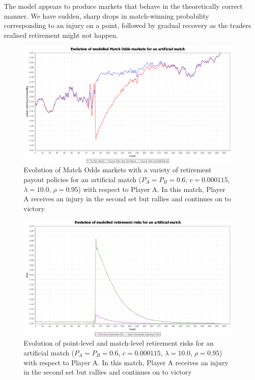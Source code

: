 \documentclass[letterpaper,12pt]{article}
\begin{document}
The model appears to produce markets that behave in the theoretically correct manner.  We have sudden, sharp drops in match-winning probability corresponding to an injury on a point, followed by gradual recovery as the traders realised retirement might not happen.

\begin{figure}[h!]
\centering \includegraphics[width=12.5cm]{matches/artificialwin}
\caption{Evolution of Match Odds markets with a variety of retirement payout policies for an artificial match ($P_A = P_B = 0.6$, $c = 0.000115$, $\lambda = 10.0$, $\rho = 0.95$) with respect to Player A.  In this match, Player A receives an injury in the second set but rallies and continues on to victory}
\label{artificialwin}
\end{figure}

\begin{figure}[H]
\centering \includegraphics[width=12.5cm]{matches/artificialwinrisk}
\caption{Evolution of point-level and match-level retirement risks for an artificial match ($P_A = P_B = 0.6$, $c = 0.000115$, $\lambda = 10.0$, $\rho = 0.95$) with respect to Player A.  In this match, Player A receives an injury in the second set but rallies and continues on to victory}
\label{artificialwinrisk}
\end{figure}
\end{document}
